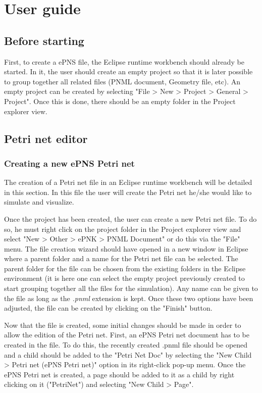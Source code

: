 \section{User guide}
\label{sec:userguide}

\subsection{Before starting}
First, to create a ePNS file, the Eclipse runtime workbench should already be started. In it, the user should create an empty project so that it is later possible to group together all related files (PNML document, Geometry file, etc). An empty project can be created by selecting "File > New > Project > General > Project". Once this is done, there should be an empty folder in the Project explorer view.

\subsection{Petri net editor}
\label{sec:userguide:petrinet}

\subsubsection{Creating a new ePNS Petri net}
\label{sec:userguide:petrinet:create}
The creation of a Petri net file in an Eclipse runtime workbench will be detailed in this section. In this file the user will create the Petri net he/she would like to simulate and visualize.

Once the project has been created, the user can create a new Petri net file. To do so, he must right click on the project folder in the Project explorer view and select "New > Other > ePNK > PNML Document"  or do this via the "File" menu. The file creation wizard should have opened in a new window in Eclipse where a parent folder and a name for the Petri net file can be selected. The parent folder for the file can be chosen from the existing folders in the Eclipse environment (it is here one can select the empty project previously created to start grouping together all the files for the simulation). Any name can be given to the file as long as the \textit{.pnml} extension is kept. Once these two options have been adjusted, the file can be created by clicking on the "Finish" button.

Now that the file is created, some initial changes should be made in order to allow the edition of the Petri net. First, an ePNS Petri net document has to be created in the file. To do this, the recently created .pnml file should be opened and a child should be added to the "Petri Net Doc" by selecting the "New Child > Petri net (ePNS Petri net)" option in its right-click pop-up menu.  Once the ePNS Petri net is created, a page should be added to it as a child by right clicking on it ("PetriNet") and selecting "New Child > Page".

